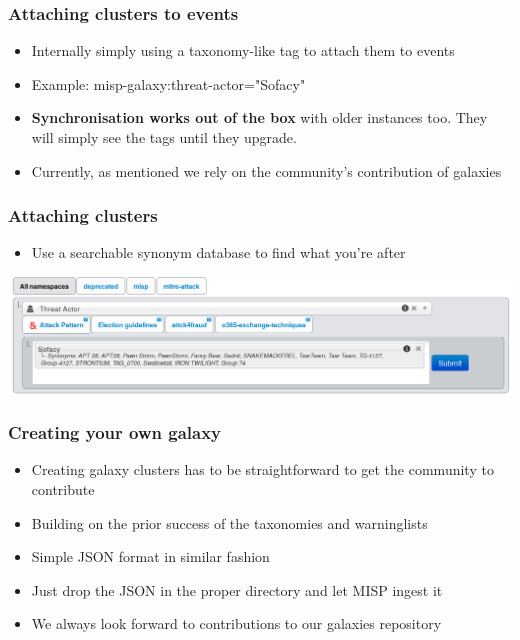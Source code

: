 \begin{frame}
\frametitle{Attaching clusters to events}
    \begin{itemize}
    	\item Internally simply using a taxonomy-like tag to attach them to events
    	\item Example: misp-galaxy:threat-actor="Sofacy"
        \item {\bf Synchronisation works out of the box} with older instances too. They will simply see the tags until they upgrade.
       	\item Currently, as mentioned we rely on the community's contribution of galaxies
    \end{itemize}
\end{frame}

\begin{frame}
\frametitle{Attaching clusters}
	\begin{itemize}
		\item Use a searchable synonym database to find what you're after
	\end{itemize}
\includegraphics[scale=0.4]{screenshots/threatactor.png}
\end{frame}

\begin{frame}
\frametitle{Creating your own galaxy}
    \begin{itemize}
    	\item Creating galaxy clusters has to be straightforward to get the community to contribute
    	\item Building on the prior success of the taxonomies and warninglists
        \item Simple JSON format in similar fashion
        \item Just drop the JSON in the proper directory and let MISP ingest it
        \item We always look forward to contributions to our galaxies repository
    \end{itemize}
\end{frame}

